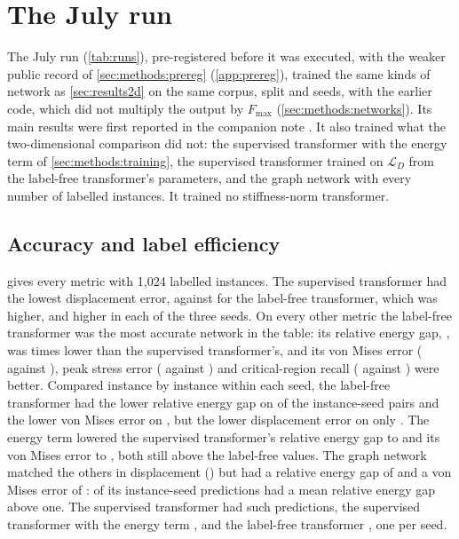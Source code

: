 \section{The July run}\label{app:july}
\setcounter{table}{0}\setcounter{figure}{0}\setcounter{equation}{0}

The July run (\cref{tab:runs}), pre-registered before it was executed, with the weaker
public record of \cref{sec:methods:prereg} (\ref{app:prereg}), trained the same kinds of
network as \cref{sec:results2d} on the same corpus, split and seeds, with the earlier code,
which did not multiply the output by $F_{\max}$ (\cref{sec:methods:networks}). Its main
results were first reported in the companion note \cite{CaoSong2026}. It also trained what
the two-dimensional comparison did not:
the supervised transformer with the energy term of \cref{sec:methods:training}, the
supervised transformer trained on $\mathcal{L}_D$ from the label-free transformer's
parameters, and the graph network with every number of labelled instances. It trained no
stiffness-norm transformer.

\subsection{Accuracy and label efficiency}\label{app:july:accuracy}



 gives every metric with 1,024 labelled instances. The supervised
transformer had the lowest displacement error, \numTwoLabDispFour{} against
\numTwoFreeDispFour{} for the label-free transformer, which was \numTwoFreeDispExcessAbs{}
higher, and higher in each of the three seeds. On every other metric the label-free
transformer was the most accurate network in the table: its relative energy gap,
\numTwoFreeGap{}, was \numTwoLabOverFreeGap{} times lower than the supervised transformer's,
and its von Mises error (\numTwoFreeVm{} against \numTwoLabVm{}), peak stress error
(\numTwoFreePeak{} against \numTwoLabPeak{}) and critical-region recall (\numTwoFreeRecall{}
against \numTwoLabRecall{}) were better. Compared instance by instance within each seed, the
label-free transformer had the lower relative energy gap on \numPairTwoLabGap{} of the
\numTwoPairs{} instance-seed pairs and the lower von Mises error on \numPairTwoLabVm{}, but
the lower displacement error on only \numPairTwoLabDisp{}. The energy term lowered the
supervised transformer's relative energy gap to \numTwoAncGap{} and its von Mises error to
\numTwoAncVm{}, both still above the label-free values. The graph network matched the others
in displacement (\numTwoMgnDisp{}) but had a relative energy gap of \numTwoMgnGap{} and a
von
Mises error of \numTwoMgnVm{}: \numTwoMgnWorse{} of its \numTwoPairs{} instance-seed
predictions had a mean relative energy gap above one. The supervised transformer had
\numTwoLabWorse{} such predictions, the supervised transformer with the energy term
\numTwoAncWorse{}, and the label-free transformer \numTwoFreeWorse{}, one per seed.

